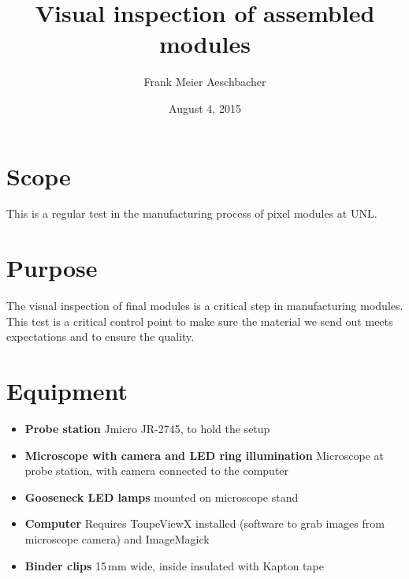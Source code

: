 \documentclass[12pt]{unlsilabsop}
\title{Visual inspection of assembled modules}
\date{August 4, 2015}
\author{Frank Meier Aeschbacher}
\begin{document}
\maketitle

\section{Scope}
This is a regular test in the manufacturing process of pixel modules at UNL.

\section{Purpose}
The visual inspection of final modules is a critical step in manufacturing modules. This test is a critical control point to make sure the material we send out meets expectations and to ensure the quality.



\section{Equipment}

\begin{itemize}
\item \textbf{Probe station} Jmicro JR-2745, to hold the setup
\item \textbf{Microscope with camera and LED ring illumination} Microscope at probe station, with camera connected to the computer
\item \textbf{Gooseneck LED lamps} mounted on microscope stand
\item \textbf{Computer} Requires ToupeViewX installed (software to grab images from microscope camera) and ImageMagick
\item \textbf{Binder clips} 15\,mm wide, inside insulated with Kapton tape
\end{itemize}
\end{document}

